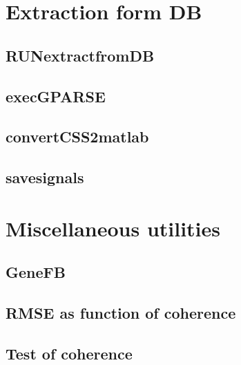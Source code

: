 {{{{{%
\chapter{Extraction form DB}

 \clearpage
\section{RUNextractfromDB}
{\tiny }

 \clearpage
\section{execGPARSE}
{\tiny }

 \clearpage
\section{convertCSS2matlab}
{\tiny }

 \clearpage
\section{savesignals}
{\tiny }


\chapter{Miscellaneous utilities}
\section{GeneFB}
{\tiny }

 \section{RMSE as function of coherence}
{\tiny }

  \newpage
  \section{Test of coherence}
{\tiny }
 
}}}}}
